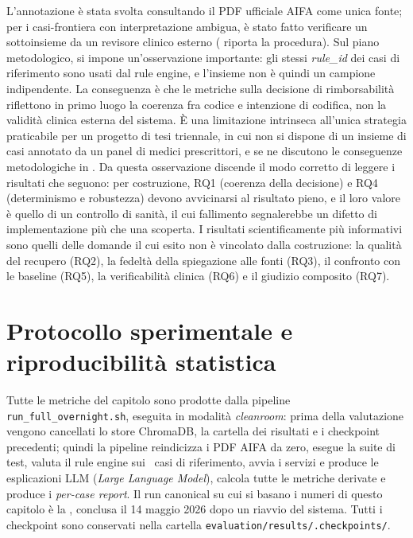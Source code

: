 L'annotazione è stata svolta consultando il PDF ufficiale AIFA come unica fonte; per i casi-frontiera con interpretazione ambigua, è stato fatto verificare un sottoinsieme da un revisore clinico esterno ( riporta la procedura). Sul piano metodologico, si impone un'osservazione importante: gli stessi \emph{rule\_id} dei casi di riferimento sono usati dal rule engine, e l'insieme non è quindi un campione indipendente. La conseguenza è che le metriche sulla decisione di rimborsabilità riflettono in primo luogo la coerenza fra codice e intenzione di codifica, non la validità clinica esterna del sistema. È una limitazione intrinseca all'unica strategia praticabile per un progetto di tesi triennale, in cui non si dispone di un insieme di casi annotato da un panel di medici prescrittori, e se ne discutono le conseguenze metodologiche in . Da questa osservazione discende il modo corretto di leggere i risultati che seguono: per costruzione, RQ1 (coerenza della decisione) e RQ4 (determinismo e robustezza) devono avvicinarsi al risultato pieno, e il loro valore è quello di un controllo di sanità, il cui fallimento segnalerebbe un difetto di implementazione più che una scoperta. I risultati scientificamente più informativi sono quelli delle domande il cui esito non è vincolato dalla costruzione: la qualità del recupero (RQ2), la fedeltà della spiegazione alle fonti (RQ3), il confronto con le baseline (RQ5), la verificabilità clinica (RQ6) e il giudizio composito (RQ7).

\section{Protocollo sperimentale e riproducibilità statistica}
\label{sec:protocollo}

Tutte le metriche del capitolo sono prodotte dalla pipeline \texttt{run\_full\_overnight.sh}, eseguita in modalità \emph{cleanroom}: prima della valutazione vengono cancellati lo store ChromaDB, la cartella dei risultati e i checkpoint precedenti; quindi la pipeline reindicizza i PDF AIFA da zero, esegue la suite di test, valuta il rule engine sui \goldn\ casi di riferimento, avvia i servizi e produce le esplicazioni LLM (\emph{Large Language Model}), calcola tutte le metriche derivate e produce i \emph{per-case report}. Il run canonical su cui si basano i numeri di questo capitolo è la \cleanroomrun, conclusa il 14 maggio 2026 dopo un riavvio del sistema. Tutti i checkpoint sono conservati nella cartella \texttt{evaluation/results/.checkpoints/}.

